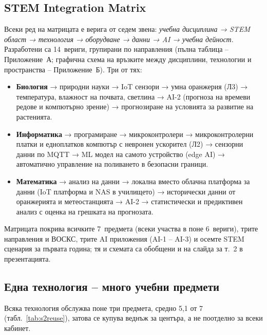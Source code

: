 \documentclass[11pt,a4paper]{article}
\begin{document}
\subsection{STEM Integration Matrix}

Всеки ред на матрицата е верига от седем звена: \emph{учебна дисциплина → STEM област → технология → оборудване → данни → AI → учебна дейност}. Разработени са 14~вериги, групирани по направления (пълна таблица – Приложение~А; графична схема на връзките между дисциплини, технологии и пространства – Приложение~Б). Три от тях:
\begin{itemize}
\item \textbf{Биология} → природни науки → IoT сензори → умна оранжерия (Л3) → температура, влажност на почвата, светлина → AI-2 (прогноза на времеви редове и компютърно зрение) → прогнозиране на условията за развитие на растенията.
\item \textbf{Информатика} → програмиране → микроконтролери → микроконтролерни платки и едноплатков компютър с невронен ускорител (Л2) → сензорни данни по MQTT → ML модел на самото устройство (edge AI) → автоматично управление на поливането в безопасни граници.
\item \textbf{Математика} → анализ на данни → локална вместо облачна платформа за данни (IoT платформа и NAS в училището) → исторически данни от оранжерията и метеостанцията → AI-2 → статистически и предиктивен анализ с оценка на грешката на прогнозата.
\end{itemize}
Матрицата покрива всичките 7~предмета (всеки участва в поне 6~вериги), трите направления и ВОСКС, трите AI приложения (AI-1 – AI-3) и осемте STEM сценария за първата година; тя и схемата са обобщени и на слайда за т.~2 в презентацията.

\subsection{Една технология – много учебни предмети}

Всяка технология обслужва поне три предмета, средно 5,1 от 7 (табл.~\ref{tab:s2reuse}), затова се купува веднъж за центъра, а не поотделно за всеки кабинет.
\end{document}
